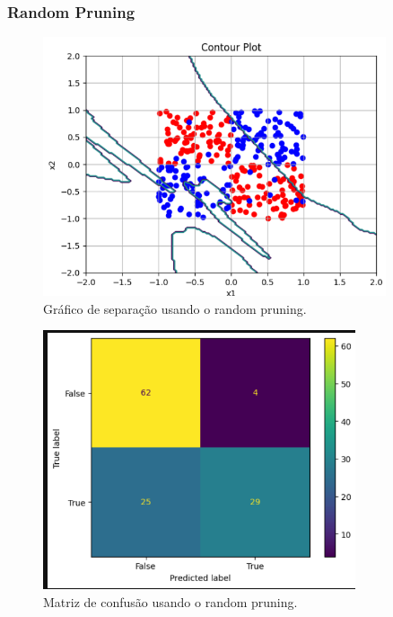 \documentclass{article}
\begin{document}
\newpage

\subsubsection*{Random Pruning}

\vspace{25pt}

\begin{figure}[h]

    \centering
    \includegraphics[height=3in]{sep_plot_random_pruning.png}
    \caption{Gráfico de separação usando o random pruning.}
    \label{fig:example}
    
\end{figure}

\vspace{25pt}

\begin{figure}[h]

    \centering
    \includegraphics[height=3in]{conf_mat_random_pruning.png}
    \caption{Matriz de confusão usando o random pruning.}
    \label{fig:example}
    
\end{figure}
\end{document}
